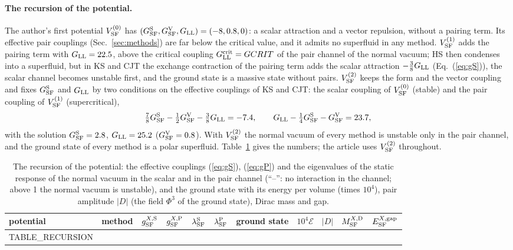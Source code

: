 \documentclass[aps,prd,onecolumn,superscriptaddress,nofootinbib,floatfix,longbibliography]{revtex4-2}
\newcommand{\LL}{{\rm LL}}
\newcommand{\SF}{{\rm SF}}
\begin{document}
\paragraph*{The recursion of the potential.}
The author's first potential $V^{(0)}_\SF$ has $(G^{\rm S}_\SF,G^{\rm V}_\SF,G_\LL)=(-8,0.8,0)$: a scalar attraction and a vector
repulsion, without a pairing term. Its effective pair couplings (Sec.~\ref{sec:methods}) are far below the critical value, and
it admits no superfluid in any method. $V^{(1)}_\SF$ adds the pairing term with $G_\LL=22.5$, above the critical coupling
$G^{\rm crit}_\LL={{GCRIT}}$ of the pair channel of the normal vacuum; HS then condenses into a superfluid, but in KS and CJT the
exchange contraction of the pairing term adds the scalar attraction $-\tfrac38G_\LL$ (Eq.~(\ref{eq:gS})), the scalar channel
becomes unstable first, and the ground state is a massive state without pairs. $V^{(2)}_\SF$ keeps the form and the vector
coupling and fixes $G^{\rm S}_\SF$ and $G_\LL$ by two conditions on the effective couplings of KS and CJT: the scalar coupling of
$V^{(0)}_\SF$ (stable) and the pair coupling of $V^{(1)}_\SF$ (supercritical),
\begin{equation}
\tfrac78G^{\rm S}_\SF-\tfrac12G^{\rm V}_\SF-\tfrac38G_\LL=-7.4,\qquad G_\LL-\tfrac14G^{\rm S}_\SF-G^{\rm V}_\SF=23.7,
\label{eq:recursion}
\end{equation}
with the solution $G^{\rm S}_\SF=2.8$, $G_\LL=25.2$ ($G^{\rm V}_\SF=0.8$). With $V^{(2)}_\SF$ the normal vacuum of every method is unstable
only in the pair channel, and the ground state of every method is a polar superfluid. Table~\ref{tab:recursion} gives the
numbers; the article uses $V^{(2)}_\SF$ throughout.

\begin{table}[h]
\caption{\label{tab:recursion}The recursion of the potential: the effective couplings (\ref{eq:gS}), (\ref{eq:gP}) and the
eigenvalues of the static response of the normal vacuum in the scalar and in the pair channel (``--'': no interaction in the
channel; above 1 the normal vacuum is unstable), and the ground state with its energy per volume (times $10^4$), pair
amplitude $|D|$ (the field $\Phi^3$ of the ground state), Dirac mass and gap.}
\begin{ruledtabular}
\begin{tabular}{llrrrrlrrrr}
potential & method & $g^{X,{\rm S}}_\SF$ & $g^{X,{\rm P}}_\SF$ & $\lambda^{\rm S}_\SF$ & $\lambda^{\rm P}_\SF$ & ground state & $10^4\mathcal E$ & $|D|$ & $M^{X,{\rm D}}_\SF$ & $E^{X,{\rm gap}}_\SF$ \\
\hline
{{TABLE_RECURSION}}
\end{tabular}
\end{ruledtabular}
\end{table}
\end{document}
